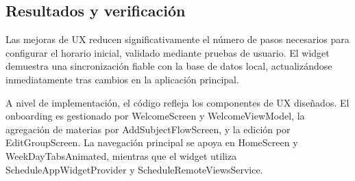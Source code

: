 \subsection{Resultados y verificación}
Las mejoras de UX reducen significativamente el número de pasos necesarios para configurar el horario inicial, validado mediante pruebas de usuario. El widget demuestra una sincronización fiable con la base de datos local, actualizándose inmediatamente tras cambios en la aplicación principal.

A nivel de implementación, el código refleja los componentes de UX diseñados. El onboarding es gestionado por WelcomeScreen y WelcomeViewModel, la agregación de materias por AddSubjectFlowScreen, y la edición por EditGroupScreen. La navegación principal se apoya en HomeScreen y WeekDayTabsAnimated, mientras que el widget utiliza ScheduleAppWidgetProvider y ScheduleRemoteViewsService.

